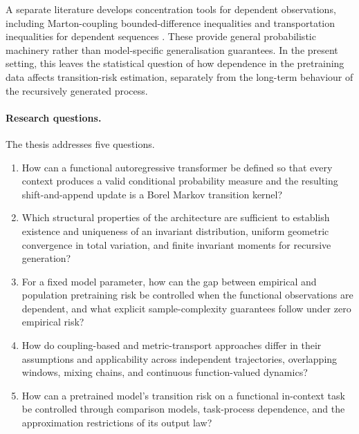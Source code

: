 A separate literature develops concentration tools for dependent observations, including Marton-coupling bounded-difference inequalities \cite{Paulin2015} and transportation inequalities for dependent sequences \cite{DjelloutGuillinWu2004}. These provide general probabilistic machinery rather than model-specific generalisation guarantees. In the present setting, this leaves the statistical question of how dependence in the pretraining data affects transition-risk estimation, separately from the long-term behaviour of the recursively generated process.

\paragraph{Research questions.}
The thesis addresses five questions.
\begin{enumerate}[label=(Q\arabic*)]
    \item How can a functional autoregressive transformer be defined so that every context produces a valid conditional probability measure and the resulting shift-and-append update is a Borel Markov transition kernel?

    \item Which structural properties of the architecture are sufficient to establish existence and uniqueness of an invariant distribution, uniform geometric convergence in total variation, and finite invariant moments for recursive generation?

    \item For a fixed model parameter, how can the gap between empirical and population pretraining risk be controlled when the functional observations are dependent, and what explicit sample-complexity guarantees follow under zero empirical risk?

    \item How do coupling-based and metric-transport approaches differ in their assumptions and applicability across independent trajectories, overlapping windows, mixing chains, and continuous function-valued dynamics?

    \item How can a pretrained model's transition risk on a functional in-context task be controlled through comparison models, task-process dependence, and the approximation restrictions of its output law?
\end{enumerate}

